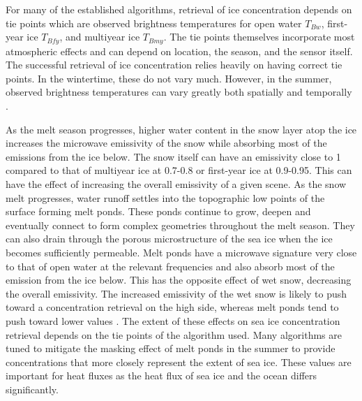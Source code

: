 \par For many of the established algorithms, retrieval of ice concentration depends on tie points which are observed brightness temperatures for open water $T_{Bw}$, first-year ice $T_{Bfy}$, and multiyear ice $T_{Bmy}$.  The tie points themselves incorporate most atmospheric effects and can depend on location, the season, and the sensor itself.  The successful retrieval of ice concentration relies heavily on having correct tie points. In the wintertime, these do not vary much. However, in the summer, observed brightness temperatures can vary greatly both spatially and temporally \cite{Willmes2014}.

\par As the melt season progresses, higher water content in the snow layer atop the ice increases the microwave emissivity of the snow while absorbing most of the emissions from the ice below. The snow itself can have an emissivity close to 1 compared to that of multiyear ice at 0.7-0.8 or first-year ice at 0.9-0.95. This can have the effect of increasing the overall emissivity of a given scene. As the snow melt progresses, water runoff settles into the topographic low points of the surface forming melt ponds.  These ponds continue to grow, deepen and eventually connect to form complex geometries throughout the melt season. They can also drain through the porous microstructure of the sea ice when the ice becomes sufficiently permeable. Melt ponds have a microwave signature very close to that of open water at the relevant frequencies and also absorb most of the emission from the ice below. This has the opposite effect of wet snow, decreasing the overall emissivity. The increased emissivity of the wet snow is likely to push toward a concentration retrieval on the high side, whereas melt ponds tend to push toward lower values \cite{Kern2016,Kongoli2011}. The extent of these effects on sea ice concentration retrieval depends on the tie points of the algorithm used. Many algorithms are tuned to mitigate the masking effect of melt ponds in the summer to provide concentrations that more closely represent the extent of sea ice. These values are important for heat fluxes as the heat flux of sea ice and the ocean differs significantly. 

